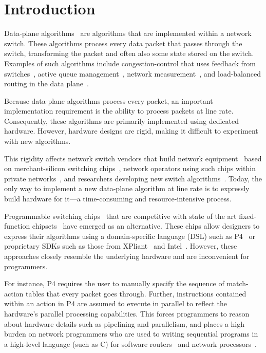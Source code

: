 \section{Introduction}
\label{s:intro}

Data-plane algorithms~\cite{cestan} are algorithms that are implemented within
a network switch. These algorithms process every data packet that passes
through the switch, transforming the packet and often also some state stored on
the switch.  Examples of such algorithms include congestion-control that uses
feedback from switches~\cite{xcp, rcp, pdq, dctcp}, active queue
management~\cite{codel}, network measurement~\cite{opensketch, bitmap_george,
elephant_george}, and load-balanced routing in the data plane~\cite{conga}.

Because data-plane algorithms process every packet, an important implementation
requirement is the ability to process packets at line rate.  Consequently,
these algorithms are primarily implemented using dedicated hardware. However,
hardware designs are rigid, making it difficult to experiment with new
algorithms.

This rigidity affects network switch vendors that build network
equipment~\cite{cisco_nexus, dell_force10, arista_7050} based on
merchant-silicon switching chips~\cite{trident, tomahawk, mellanox}, network
operators using such chips within private networks~\cite{google,facebook,vl2},
and researchers developing new switch algorithms~\cite{xcp, codel, d3, detail,
pdq}. Today, the only way to implement a new data-plane algorithm at line rate
is to expressly build hardware for it---a time-consuming and resource-intensive
process.

Programmable switching chips~\cite{flexpipe, xpliant, rmt} that are competitive
with state of the art fixed-function chipsets~\cite{trident, tomahawk,
mellanox} have emerged as an alternative.  These chips allow designers to
express their algorithms using a domain-specific language (DSL) such as
P4~\cite{p4} or proprietary SDKs such as those from XPliant~\cite{xpliant_sdk,
xpliant_sdk2} and Intel~\cite{intel_sdk}.  However, these approaches closely
resemble the underlying hardware and are inconvenient for programmers.

For instance, P4 requires the user to manually specify the sequence of
match-action tables that every packet goes through. Further, instructions
contained within an action in P4 are assumed to execute in parallel to reflect
the hardware's parallel processing capabilities. This forces programmers to
reason about hardware details such as pipelining and parallelism, and places a
high burden on network programmers who are used to writing sequential programs
in a high-level language (such as C) for software routers~\cite{click} and
network processors~\cite{ixp4xx, ixp2800}.

